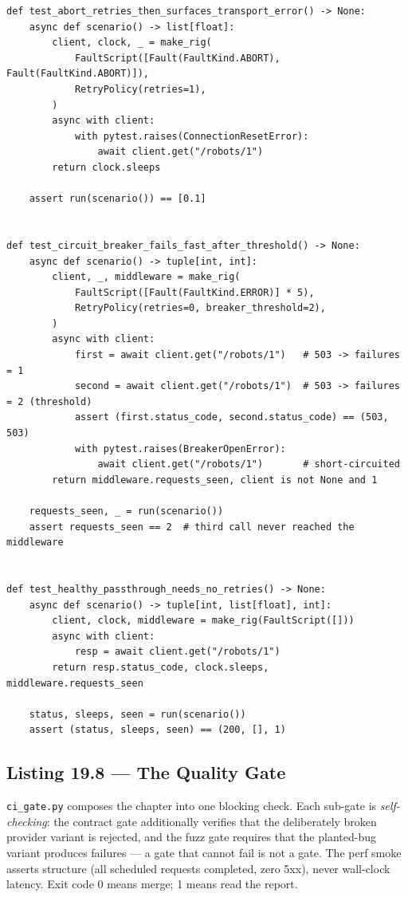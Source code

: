 \begin{verbatim}
def test_abort_retries_then_surfaces_transport_error() -> None:
    async def scenario() -> list[float]:
        client, clock, _ = make_rig(
            FaultScript([Fault(FaultKind.ABORT), Fault(FaultKind.ABORT)]),
            RetryPolicy(retries=1),
        )
        async with client:
            with pytest.raises(ConnectionResetError):
                await client.get("/robots/1")
        return clock.sleeps

    assert run(scenario()) == [0.1]


def test_circuit_breaker_fails_fast_after_threshold() -> None:
    async def scenario() -> tuple[int, int]:
        client, _, middleware = make_rig(
            FaultScript([Fault(FaultKind.ERROR)] * 5),
            RetryPolicy(retries=0, breaker_threshold=2),
        )
        async with client:
            first = await client.get("/robots/1")   # 503 -> failures = 1
            second = await client.get("/robots/1")  # 503 -> failures = 2 (threshold)
            assert (first.status_code, second.status_code) == (503, 503)
            with pytest.raises(BreakerOpenError):
                await client.get("/robots/1")       # short-circuited
        return middleware.requests_seen, client is not None and 1

    requests_seen, _ = run(scenario())
    assert requests_seen == 2  # third call never reached the middleware


def test_healthy_passthrough_needs_no_retries() -> None:
    async def scenario() -> tuple[int, list[float], int]:
        client, clock, middleware = make_rig(FaultScript([]))
        async with client:
            resp = await client.get("/robots/1")
        return resp.status_code, clock.sleeps, middleware.requests_seen

    status, sleeps, seen = run(scenario())
    assert (status, sleeps, seen) == (200, [], 1)
\end{verbatim}

\subsection{Listing 19.8 --- The Quality Gate}
\label{sec:ch19-listing-gate}

\texttt{ci\_gate.py} composes the chapter into one blocking check. Each
sub-gate is \emph{self-checking}: the contract gate additionally verifies
that the deliberately broken provider variant is rejected, and the fuzz
gate requires that the planted-bug variant produces failures --- a gate
that cannot fail is not a gate. The perf smoke asserts structure (all
scheduled requests completed, zero 5xx), never wall-clock latency. Exit
code 0 means merge; 1 means read the report.

